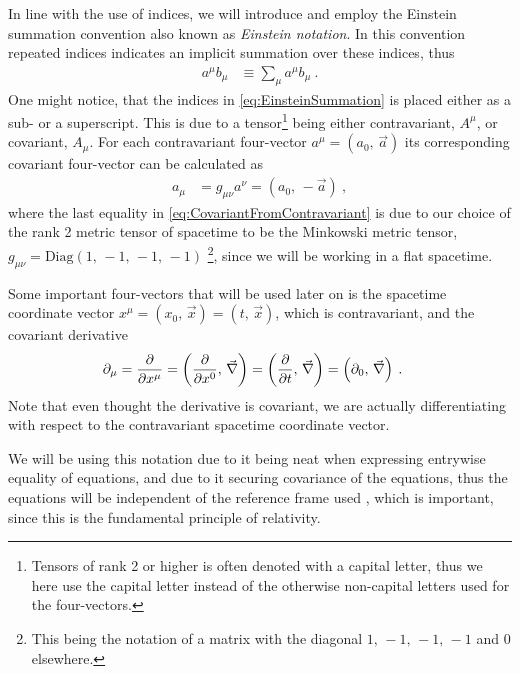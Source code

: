 \documentclass[../main.tex]{subfiles} %
\begin{document}
In line with the use of indices, we will introduce and employ the Einstein summation convention also known as \emph{Einstein notation}. In this convention repeated indices indicates an implicit summation over these indices, thus
\begin{align} \label{eq:EinsteinSummation}
    a^\mu b_\mu &\equiv \sum_\mu a^\mu b_\mu \: .
\end{align}
One might notice, that the indices in \cref{eq:EinsteinSummation} is placed either as a sub- or a superscript. This is due to a tensor\footnote{Tensors of rank 2 or higher is often denoted with a capital letter, thus we here use the capital letter instead of the otherwise non-capital letters used for the four-vectors.} being either contravariant, $A^\mu$, or covariant, $A_\mu$. For each contravariant four-vector $a^\mu = (a_0,\, \Vec{a})$ its corresponding covariant four-vector can be calculated as
\begin{align} \label{eq:CovariantFromContravariant}
    a_\mu &= g_{\mu\nu}a^\nu = (a_0,\, -\Vec{a}) \: ,
\end{align}
where the last equality in \cref{eq:CovariantFromContravariant} is due to our choice of the rank 2 metric tensor of spacetime to be the Minkowski metric tensor, $g_{\mu\nu} = \text{Diag}(1,\, -1,\, -1,\, -1)$ \footnote{This being the notation of a matrix with the diagonal $1,\, -1,\, -1,\, -1$ and $0$ elsewhere.}, since we will be working in a flat spacetime.

Some important four-vectors that will be used later on is the spacetime coordinate vector $x^\mu = (x_0,\, \Vec{x}) = (t,\, \Vec{x})$, which is contravariant, and the covariant derivative
\begin{align}
    \partial_\mu &= \pdv{}{x^\mu} = \left(\pdv{}{x^0},\, \Vec{\nabla}\right) = \left(\pdv{}{t},\, \Vec{\nabla}\right) = \left(\partial_0,\, \Vec{\nabla}\right)  \: .
\end{align}
Note that even thought the derivative is covariant, we are actually differentiating with respect to the contravariant spacetime coordinate vector.

We will be using this notation due to it being neat when expressing entrywise equality of equations, and due to it securing covariance of the equations, thus the equations will be independent of the reference frame used \cite{Uggerhoej_SpecielRelativitetsteori_2016}, which is important, since this is the fundamental principle of relativity.
\end{document}
